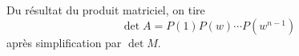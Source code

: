 Du résultat du produit matriciel, on tire
\begin{displaymath}
 \det A = P(1)P(w)\cdots P(w^{n-1})
\end{displaymath}
après simplification par $\det M$.